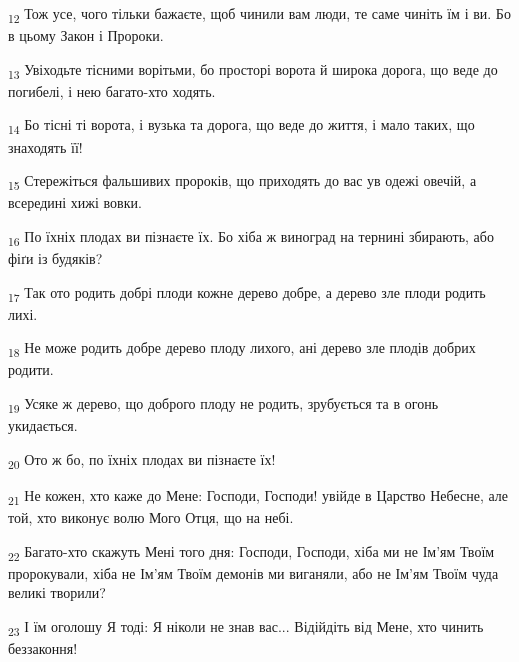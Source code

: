 \begin{tcolorbox}
\textsubscript{12} Тож усе, чого тільки бажаєте, щоб чинили вам люди, те саме чиніть їм і ви. Бо в цьому Закон і Пророки.
\end{tcolorbox}
\begin{tcolorbox}
\textsubscript{13} Увіходьте тісними ворітьми, бо просторі ворота й широка дорога, що веде до погибелі, і нею багато-хто ходять.
\end{tcolorbox}
\begin{tcolorbox}
\textsubscript{14} Бо тісні ті ворота, і вузька та дорога, що веде до життя, і мало таких, що знаходять її!
\end{tcolorbox}
\begin{tcolorbox}
\textsubscript{15} Стережіться фальшивих пророків, що приходять до вас ув одежі овечій, а всередині хижі вовки.
\end{tcolorbox}
\begin{tcolorbox}
\textsubscript{16} По їхніх плодах ви пізнаєте їх. Бо хіба ж виноград на тернині збирають, або фіґи із будяків?
\end{tcolorbox}
\begin{tcolorbox}
\textsubscript{17} Так ото родить добрі плоди кожне дерево добре, а дерево зле плоди родить лихі.
\end{tcolorbox}
\begin{tcolorbox}
\textsubscript{18} Не може родить добре дерево плоду лихого, ані дерево зле плодів добрих родити.
\end{tcolorbox}
\begin{tcolorbox}
\textsubscript{19} Усяке ж дерево, що доброго плоду не родить, зрубується та в огонь укидається.
\end{tcolorbox}
\begin{tcolorbox}
\textsubscript{20} Ото ж бо, по їхніх плодах ви пізнаєте їх!
\end{tcolorbox}
\begin{tcolorbox}
\textsubscript{21} Не кожен, хто каже до Мене: Господи, Господи! увійде в Царство Небесне, але той, хто виконує волю Мого Отця, що на небі.
\end{tcolorbox}
\begin{tcolorbox}
\textsubscript{22} Багато-хто скажуть Мені того дня: Господи, Господи, хіба ми не Ім'ям Твоїм пророкували, хіба не Ім'ям Твоїм демонів ми виганяли, або не Ім'ям Твоїм чуда великі творили?
\end{tcolorbox}
\begin{tcolorbox}
\textsubscript{23} І їм оголошу Я тоді: Я ніколи не знав вас... Відійдіть від Мене, хто чинить беззаконня!
\end{tcolorbox}
